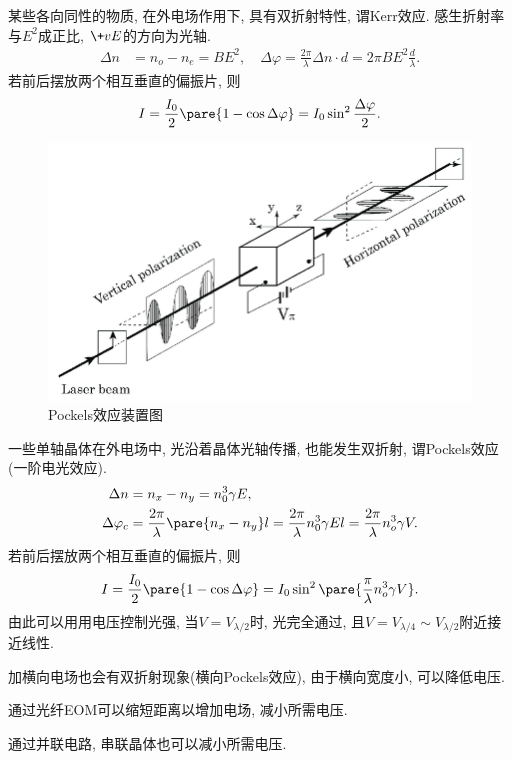 \documentclass{ctexart}
\begin{document}
某些各向同性的物质, 在外电场作用下, 具有双折射特性, 谓Kerr效应. 感生折射率与$E^2$成正比, $\+vE$的方向为光轴.
\begin{align*}
    \Delta n &= n_o - n_e = BE^2, \quad \Delta\varphi = \frac{2\pi}{\lambda}\Delta n\cdot d = 2\pi BE^2 \frac{d}{\lambda}.
\end{align*}
若前后摆放两个相互垂直的偏振片, 则
\[ I = \frac{I_0}{2}\pare{1-\cos\Delta\varphi} = I_0 \sin^2 \frac{\Delta\varphi}{2}. \]

\begin{figure}[ht]
    \centering
    \includegraphics[width=12cm]{src/ElectroOpticPockels.png}
    \caption{Pockels效应装置图}
\end{figure}

一些单轴晶体在外电场中, 光沿着晶体光轴传播, 也能发生双折射, 谓Pockels效应(一阶电光效应).
\begin{align*}
    \Delta n &= n_x - n_y = n_0^3\gamma E, \\
    \Delta \varphi_c &= \frac{2\pi}{\lambda}\pare{n_x - n_y}l = \frac{2\pi}{\lambda}n_0^3 \gamma El = \frac{2\pi}{\lambda}n_o^3 \gamma V.
\end{align*}
若前后摆放两个相互垂直的偏振片, 则
\[ I = \frac{I_0}{2}\pare{1-\cos\Delta\varphi} = I_0 \sin^2 \pare{\frac{\pi}{\lambda}n_o^3 \gamma V}. \]
由此可以用用电压控制光强, 当$V=V_{\lambda/2}$时, 光完全通过, 且$V=V_{\lambda/4}\sim V_{\lambda/2}$附近接近线性.

\begin{remark}
    加横向电场也会有双折射现象(横向Pockels效应), 由于横向宽度小, 可以降低电压.
\end{remark}
\begin{remark}
    通过光纤EOM可以缩短距离以增加电场, 减小所需电压.
\end{remark}
\begin{remark}
    通过并联电路, 串联晶体也可以减小所需电压.
\end{remark}
\end{document}
